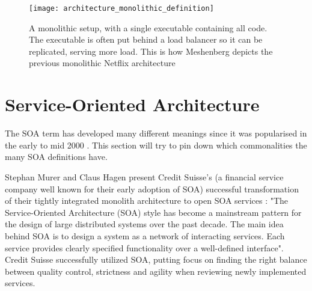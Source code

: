 \begin{figure}[!htb]
\begin{center} 
  \texttt{[image: architecture\_monolithic\_definition]}  
  \caption{A monolithic setup, with a single executable containing all code. The executable is often put behind a load balancer so it can be replicated, serving more load. This is how Meshenberg depicts the previous monolithic Netflix architecture}
  \label{fig:architecture_monolithic_definition}
  \end{center} 
\end{figure}

\section{Service-Oriented Architecture}
The SOA term has developed many different meanings \cite{microsoft2017chapter, george2016it, murer2015fifteen, sosinsky2010cloud, fowler2014microservicesoamonolith} since it was popularised in the early to mid 2000 \cite[t.16:00]{george2016it}. This section will try to pin down which commonalities the many SOA definitions have.

Stephan Murer and Claus Hagen present Credit Suisse's (a financial service company well known for their early adoption of SOA) successful transformation of their tightly integrated monolith architecture to open SOA services  \cite{murer2015fifteen}: "The Service-Oriented Architecture (SOA) style has become a mainstream pattern for the design of large distributed systems over the past decade. The main idea behind SOA is to design a system as a network of interacting services. Each service provides clearly specified functionality over a well-defined interface". Credit Suisse successfully utilized SOA, putting focus on finding the right balance between quality control, strictness and agility when reviewing newly implemented services.

